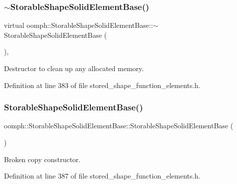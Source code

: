 \subsubsection{\texorpdfstring{$\sim$\+Storable\+Shape\+Solid\+Element\+Base()}{~StorableShapeSolidElementBase()}}
{\footnotesize\ttfamily virtual oomph\+::\+Storable\+Shape\+Solid\+Element\+Base\+::$\sim$\+Storable\+Shape\+Solid\+Element\+Base (\begin{DoxyParamCaption}{ }\end{DoxyParamCaption})\hspace{0.3cm}{\ttfamily [inline]}, {\ttfamily [virtual]}}



Destructor to clean up any allocated memory. 



Definition at line 383 of file stored\+\_\+shape\+\_\+function\+\_\+elements.\+h.

\mbox{\label{classoomph_1_1StorableShapeSolidElementBase_a4fc88feb5411e582a2640268ec733ad7}} 
\subsubsection{\texorpdfstring{Storable\+Shape\+Solid\+Element\+Base()}{StorableShapeSolidElementBase()}\hspace{0.1cm}{\footnotesize\ttfamily [2/2]}}
{\footnotesize\ttfamily oomph\+::\+Storable\+Shape\+Solid\+Element\+Base\+::\+Storable\+Shape\+Solid\+Element\+Base (\begin{DoxyParamCaption}\item[{const \hyperlink{classoomph_1_1StorableShapeSolidElementBase}{Storable\+Shape\+Solid\+Element\+Base} \&}]{ }\end{DoxyParamCaption})\hspace{0.3cm}{\ttfamily [inline]}}



Broken copy constructor. 



Definition at line 387 of file stored\+\_\+shape\+\_\+function\+\_\+elements.\+h.




